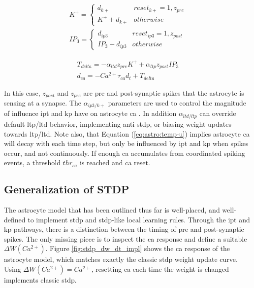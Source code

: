 \documentclass[conference]{IEEEtran}
\newcommand{\ca}{\gls{ca}\textrm{ }}
\newcommand{\cam}{Ca^{2+}}
\newcommand{\ipt}{\gls{ipt}\textrm{ }}
\newcommand{\kp}{\gls{kp}\textrm{ }}
\newcommand{\eq}[1]{Equation (\ref{#1})}
\begin{document}
\begin{align}
  K^+ =
  \begin{cases} 
    d_{k+} & reset_{k+} = 1, z_{pre}
    \\ K^+ + d_{k+} & otherwise
  \end{cases} \\
  IP_3 =
  \begin{cases} 
    d_{ip3} & reset_{ip3} = 1, z_{post}
    \\ IP_3 + d_{ip3} & otherwise
  \end{cases}
\end{align}

\begin{align}
T_{delta} = -\alpha_{ltd} z_{pre} K^+ + \alpha_{ltp} z_{post} IP_3\\
d_{ca} = -\cam \tau_{ca} d_t + T_{delta} \label{eq:astro:temp-u}
\end{align}

In this case, $z_{post}$ and $z_{pre}$ are pre and post-synaptic spikes that the
astrocyte is sensing at a synapse. The $\alpha_{ip3/k+}$ parameters are
used to control the magnitude of influence \ipt and \kp have on astrocyte
\ca. In addition $\alpha_{ltd/ltp}$ can override default \gls{ltp}/\gls{ltd}
behavior, implementing anti-stdp, or biasing weight updates towards
\gls{ltp}/\gls{ltd}. Note also, that \eq{eq:astro:temp-u} implies astrocyte \ca
will decay with each time step, but only be influenced by \ipt and \kp when
spikes occur, and not continuously. If enough \ca accumulates from coordinated
spiking events, a threshold $thr_{ca}$ is reached and \ca reset.



\subsection{Generalization of STDP}

The astrocyte model that has been outlined thus far is well-placed, and
well-defined to implement \gls{stdp} and \gls{stdp}-like local learning
rules. Through the \gls{ipt} and \gls{kp} pathways, there is a distinction
between the timing of pre and post-synaptic spikes. The only missing piece is to
inspect the \ca response and define a suitable $\Delta W(\cam)$. Figure
\ref{fig:stdp_dw_dt_impl} shows the \ca response of the astrocyte model, which
matches exactly the classic \gls{stdp} weight update curve. Using $\Delta
W(\cam)=\cam$, resetting \ca each time the weight is changed implements classic
\gls{stdp}.
\end{document}
